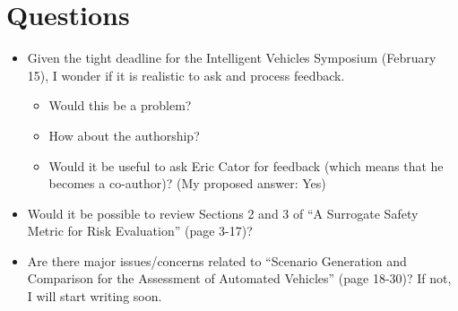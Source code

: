 \documentclass[10pt,final,a4paper,oneside,onecolumn]{article}
\begin{document}
\section{Questions}

\begin{itemize}
	\item Given the tight deadline for the Intelligent Vehicles Symposium (February 15), I wonder if it is realistic to ask and process feedback. 
	\begin{itemize}
		\item Would this be a problem? 
		\item How about the authorship?
		\item Would it be useful to ask Eric Cator for feedback (which means that he becomes a co-author)? (My proposed answer: Yes)
	\end{itemize}
	
	\item Would it be possible to review Sections 2 and 3 of ``A Surrogate Safety Metric for Risk Evaluation'' (page 3-17)?
	
	\item Are there major issues/concerns related to ``Scenario Generation and Comparison for the Assessment of Automated Vehicles'' (page 18-30)? If not, I will start writing soon. 
\end{itemize}



\clearpage



\end{document}
